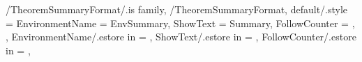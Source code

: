 \newcommand{\InsertConclusion}[1]
{%
  \InsertTheoremContent[\empty]{%
    \GetTheoremConclusionFormatEnvironmentName}{#1}%
} %

\newcommand{\InitTheoremConclusionFormat}
{%
  \ifthenelse{\equal{\GetTheoremConclusionFormatFollowCounter}{\empty}}%
  {%
    \newtheorem*{%
      \GetTheoremConclusionFormatEnvironmentName}{%
      \GetTheoremConclusionFormatShowText}
  }%
  {%
    \newtheorem{%
      \GetTheoremConclusionFormatEnvironmentName}{%
      \GetTheoremConclusionFormatShowText}[%
      \GetTheoremConclusionFormatFollowCounter]%
  }%
} %


\pgfkeys
{
  /TheoremSummaryFormat/.is family, /TheoremSummaryFormat,
  default/.style =
  {
    EnvironmentName = {EnvSummary},
    ShowText = {Summary},
    FollowCounter = \empty,
  },
  EnvironmentName/.estore in = \GetTheoremSummaryFormatEnvironmentName,
  ShowText/.estore in = \GetTheoremSummaryFormatShowText,
  FollowCounter/.estore in = \GetTheoremSummaryFormatFollowCounter,
} %

\newcommand{\InsertSummary}[1]
{%
  \InsertTheoremContent[\empty]{%
    \GetTheoremSummaryFormatEnvironmentName}{#1}%
} %

\newcommand{\InitTheoremSummaryFormat}
{%
  \ifthenelse{\equal{\GetTheoremSummaryFormatFollowCounter}{\empty}}%
  {%
    \newtheorem*{%
      \GetTheoremSummaryFormatEnvironmentName}{%
      \GetTheoremSummaryFormatShowText}
  }%
  {%
    \newtheorem{%
      \GetTheoremSummaryFormatEnvironmentName}{%
      \GetTheoremSummaryFormatShowText}[%
      \GetTheoremSummaryFormatFollowCounter]%
  }%
} %


\newcommand{\InitTheoremFormats}
{%
  \InitTheoremDefinitionFormat%
  \InitTheoremConditionFormat%
  \InitTheoremProblemFormat%
  \InitTheoremExampleFormat%
  \InitTheoremTheoremFormat%
  \InitTheoremLemmaFormat%
  \InitTheoremCorollarieFormat%
  \InitTheoremPropositionFormat%
  \InitTheoremConjectureFormat%
  \InitTheoremProofFormat%
  \InitTheoremNoteFormat%
  \InitTheoremAnnotationFormat%
  \InitTheoremClaimFormat%
  \InitTheoremCaseFormat%
  \InitTheoremAcknowledgmentFormat%
  \InitTheoremConclusionFormat%
  \InitTheoremCriterionFormat%
  \InitTheoremAssertionFormat%
  \InitTheoremQuestionFormat%
  \InitTheoremHypothesisFormat%
  \InitTheoremSummaryFormat%
} %

